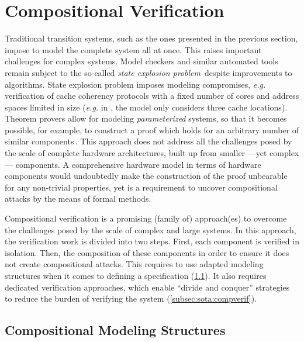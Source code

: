 \section{Compositional Verification}
\label{section:sota:compsec}

Traditional transition systems, such as the ones presented in the previous
section, impose to model the complete system all at once.
%
This raises important challenges for complex systems.
%
Model checkers and similar automated tools remain subject to the so-called
\emph{state explosion problem}\,\cite{clarke2012model} despite improvements to
algorithms.
%
State explosion problem imposes modeling compromises, \emph{e.g.}  verification
of cache coherency protocols with a fixed number of cores and address spaces
limited in size (\emph{e.g.} in \cite{lie2003xom}, the model only considers
three cache locations).
%
Theorem provers allow for modeling \emph{parameterized} systems, so that it
becomes possible, for example, to construct a proof which holds for an arbitrary
number of similar components\,\cite{vijayaraghavan2015modular}.
%
This approach does not address all the challenges posed by the scale of complete
hardware architectures, built up from smaller ---yet complex--- components.
%
A comprehensive hardware model in terms of hardware components would undoubtedly
make the construction of the proof unbearable for any non-trivial properties,
yet is a requirement to uncover compositional attacks by the means of formal
methods.

Compositional verification is a promising (family of) approach(es) to overcome
the challenges posed by the scale of complex and large systems.
%
In this approach, the verification work is divided into two steps.
%
First, each component is verified in isolation.
%
Then, the composition of these components in order to ensure it does not create
compositional attacks.
%
This requires to use adapted modeling structures when it comes to defining a
specification (\ref{subsec:sota:compmod}).
%
It also requires dedicated verification approaches, which enable ``divide and
conquer'' strategies to reduce the burden of verifying the system
(\ref{subsec:sota:compverif}).

\subsection{Compositional Modeling Structures}
\label{subsec:sota:compmod}

